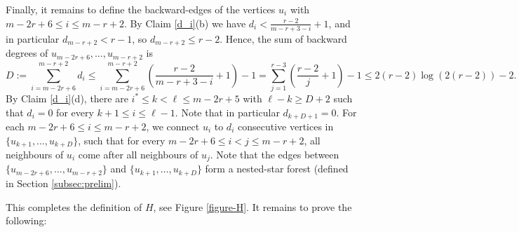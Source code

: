 \documentclass[11pt]{article}
\let\oldendproof\endproof
\renewenvironment{proof}[1][\proofname]{%
	\oldproof[\bf #1]%
}{\oldendproof}
\theoremstyle{plain}
\begin{document}
\begin{proof}[Proof of Lemma \ref{r-graphs induction base case}]
    Finally, it remains to define the backward-edges of the vertices $u_i$ with $m-2r+6 \leq i \leq m-r+2$. By Claim \ref{d_i}(b) we have $d_i < \frac{r-2}{m-r+3-i} + 1$, and in particular $d_{m-r+2} < r-1$, so $d_{m-r+2} \leq r-2$. 
    Hence, the sum of backward degrees of $u_{m-2r+6},\dots,u_{m-r+2}$ is 
    $$
    D := \sum_{i=m-2r+6}^{m-r+2}\!\!\!d_i \leq \sum_{i=m-2r+6}^{m-r+2} \left( \frac{r-2}{m-r+3-i} + 1 \right) - 1 = 
    \sum_{j = 1}^{r-3}\left( \frac{r-2}{j} + 1\right) - 1
    \leq 2(r-2)\log(2(r-2))-2.
    $$
    By Claim \ref{d_i}(d), there are $i^* \leq k < \ell \leq m-2r+5$ with $\ell-k \geq D+2$ such that $d_i = 0$ for every $k+1 \leq i \leq \ell-1$. Note that in particular $d_{k+D+1} = 0$. 
    For each $m-2r+6 \leq i \leq m-r+2$, we connect $u_i$ to $d_i$ consecutive vertices in $\{u_{k+1},\dots,u_{k+D}\}$, such that for every $m-2r+6 \leq i < j \leq m-r+2$, all neighbours of $u_i$ come after all neighbours of $u_j$. 
    Note that the edges between 
    $\{u_{m-2r+6},\dots,u_{m-r+2}\}$ and 
    $\{u_{k+1},\dots,u_{k+D}\}$ form a nested-star forest (defined in Section \ref{subsec:prelim}). 
    
    This completes the definition of $H$, see Figure \ref{figure-H}. It remains to prove the following:





\end{proof}
\end{document}
